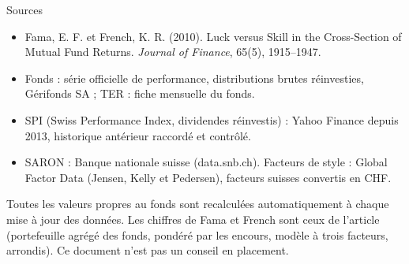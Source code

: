 \documentclass[aspectratio=169,11pt]{beamer}
\begin{document}
\begin{frame}{Sources}
  \small
  \begin{itemize}
    \item Fama, E. F. et French, K. R. (2010). Luck versus Skill in the Cross-Section of Mutual Fund Returns. \emph{Journal of Finance}, 65(5), 1915–1947.
    \item Fonds : série officielle de performance, distributions brutes réinvesties, Gérifonds SA ; TER : fiche mensuelle du fonds.
    \item SPI (Swiss Performance Index, dividendes réinvestis) : Yahoo Finance depuis 2013, historique antérieur raccordé et contrôlé.
    \item SARON : Banque nationale suisse (data.snb.ch). Facteurs de style : Global Factor Data (Jensen, Kelly et Pedersen), facteurs suisses convertis en CHF.
  \end{itemize}
  \vfill
  {\scriptsize\color{gris} Toutes les valeurs propres au fonds sont recalculées automatiquement à chaque mise à jour des données. Les chiffres de Fama et French sont ceux de l'article (portefeuille agrégé des fonds, pondéré par les encours, modèle à trois facteurs, arrondis). Ce document n'est pas un conseil en placement.}
\end{frame}
\end{document}
